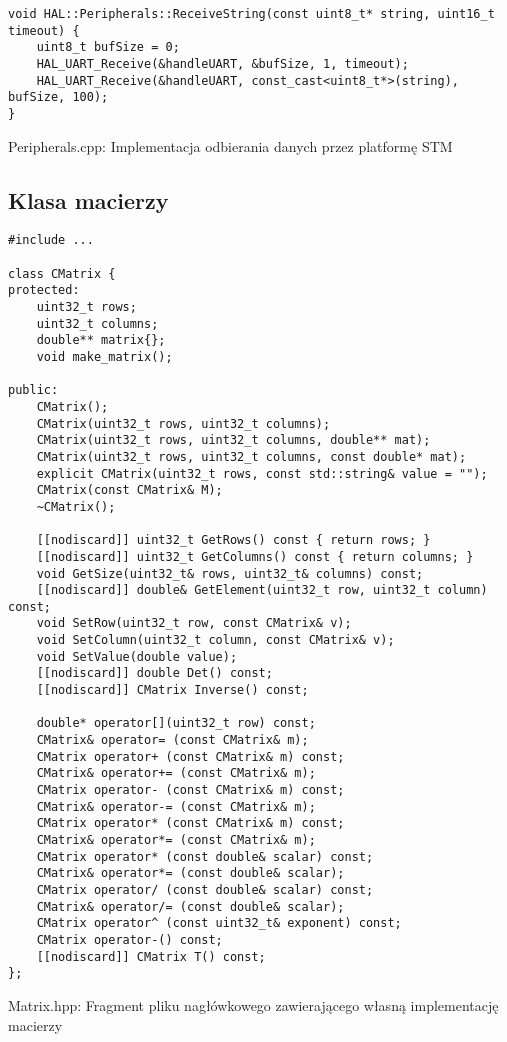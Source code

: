 \begin{listing}[htb]
\begin{verbatim}
void HAL::Peripherals::ReceiveString(const uint8_t* string, uint16_t timeout) {
    uint8_t bufSize = 0;
    HAL_UART_Receive(&handleUART, &bufSize, 1, timeout);
    HAL_UART_Receive(&handleUART, const_cast<uint8_t*>(string), bufSize, 100);
}
\end{verbatim}
\caption{Peripherals.cpp: Implementacja odbierania danych przez platformę STM}
\label{lst:sendstring_cpp}
\end{listing}

\subsection{Klasa macierzy} \label{sec:matrices}

\begin{listing}[htb]
\begin{verbatim}
#include ...

class CMatrix {
protected:
    uint32_t rows;
    uint32_t columns;
    double** matrix{};
    void make_matrix();

public:
    CMatrix();
    CMatrix(uint32_t rows, uint32_t columns);
    CMatrix(uint32_t rows, uint32_t columns, double** mat);
    CMatrix(uint32_t rows, uint32_t columns, const double* mat);
    explicit CMatrix(uint32_t rows, const std::string& value = "");
    CMatrix(const CMatrix& M);
    ~CMatrix();

    [[nodiscard]] uint32_t GetRows() const { return rows; }
    [[nodiscard]] uint32_t GetColumns() const { return columns; }
    void GetSize(uint32_t& rows, uint32_t& columns) const;
    [[nodiscard]] double& GetElement(uint32_t row, uint32_t column) const;
    void SetRow(uint32_t row, const CMatrix& v);
    void SetColumn(uint32_t column, const CMatrix& v);
    void SetValue(double value);
    [[nodiscard]] double Det() const;
    [[nodiscard]] CMatrix Inverse() const;

    double* operator[](uint32_t row) const;
    CMatrix& operator= (const CMatrix& m);
    CMatrix operator+ (const CMatrix& m) const;
    CMatrix& operator+= (const CMatrix& m);
    CMatrix operator- (const CMatrix& m) const;
    CMatrix& operator-= (const CMatrix& m);
    CMatrix operator* (const CMatrix& m) const;
    CMatrix& operator*= (const CMatrix& m);
    CMatrix operator* (const double& scalar) const;
    CMatrix& operator*= (const double& scalar);
    CMatrix operator/ (const double& scalar) const;
    CMatrix& operator/= (const double& scalar);
    CMatrix operator^ (const uint32_t& exponent) const;
    CMatrix operator-() const;
    [[nodiscard]] CMatrix T() const;
};
\end{verbatim}
\caption{Matrix.hpp: Fragment pliku nagłówkowego zawierającego własną implementację macierzy}
\label{lst:matrix_hpp}
\end{listing}

